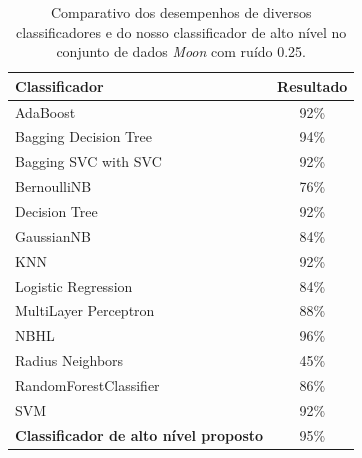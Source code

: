 \documentclass[
12pt,        %
oneside,     %
a4paper,     %
english,       %
brazil        %
%
%
]{ppgca}
\begin{document}
\begin{table}[ht]
\caption{Comparativo dos desempenhos de diversos classificadores e do nosso classificador de alto nível no conjunto de dados \textit{Moon} com ruído 0.25.}
\label{tab:resultadomoon2}
  \centering
\begin{tabular}{l|c}\hline
 Classificador & Resultado\\\hline
AdaBoost & 92\% \\ 
Bagging Decision Tree & 94\% \\ 
Bagging SVC with SVC & 92\% \\ 
BernoulliNB & 76\% \\
Decision Tree & 92\% \\
GaussianNB & 84\% \\
KNN & 92\% \\ 
Logistic Regression & 84\% \\
MultiLayer Perceptron & 88\% \\ 
NBHL \cite{Colliri2018} & 96\% \\
Radius Neighbors & 45\% \\
RandomForestClassifier & 86\% \\ 
SVM & 92\% \\
\textbf{Classificador de alto nível proposto} & 95\% \\\hline
\end{tabular}
\end{table}
\end{document}
